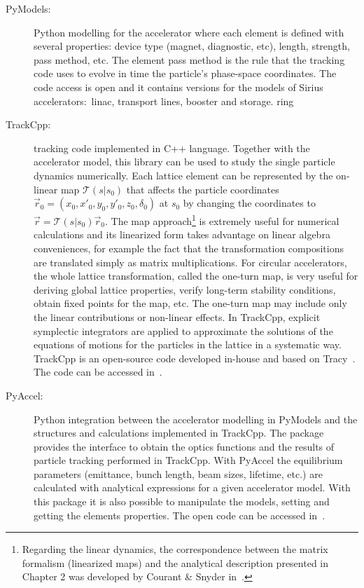 \begin{description}
    \item[PyModels:] Python modelling for the accelerator where each element is defined with several properties: device type (magnet, diagnostic, etc), length, strength, pass method, etc. The element pass method is the rule that the tracking code uses to evolve in time the particle's phase-space coordinates. The code access is open and it contains versions for the models of Sirius accelerators:~\gls{linac}, transport lines, booster and storage. ring~\cite{pymodels}
    \item[TrackCpp:] tracking code implemented in C++ language. Together with the accelerator model, this library can be used to study the single particle dynamics numerically. Each lattice element can be represented by the on-linear map $\mathcal{T}(s|s_0)$ that affects the particle coordinates $\vec{r}_0 = \left(x_0, x'_0, y_0, y'_0, z_0, \delta_0\right)$ at $s_0$ by changing the coordinates to $\vec{r} = \mathcal{T}(s|s_0)\vec{r}_0$. The map approach\footnote{Regarding the linear dynamics, the correspondence between the matrix formalism (linearized maps) and the analytical description presented in Chapter 2 was developed by Courant \& Snyder in~\cite{CourantSnyder1958}.} is extremely useful for numerical calculations and its linearized form takes advantage on linear algebra conveniences, for example the fact that the transformation compositions are translated simply as matrix multiplications. For circular accelerators, the whole lattice transformation, called the one-turn map, is very useful for deriving global lattice properties, verify long-term stability conditions, obtain fixed points for the map, etc. The one-turn map may include only the linear contributions or non-linear effects. In TrackCpp, explicit symplectic integrators are applied to approximate the solutions of the equations of motions for the particles in the lattice in a systematic way. TrackCpp is an open-source code developed in-house and based on Tracy~\cite{tracy}. The code can be accessed in~\cite{trackcpp}.
    \item[PyAccel:] Python integration between the accelerator modelling in PyModels and the structures and calculations implemented in TrackCpp. The package provides the interface to obtain the optics functions and the results of particle tracking performed in TrackCpp. With PyAccel the equilibrium parameters (emittance, bunch length, beam sizes, lifetime, etc.) are calculated with analytical expressions for a given accelerator model. With this package it is also possible to manipulate the models, setting and getting the elements properties. The open code can be accessed in~\cite{pyaccel}.
\end{description}

